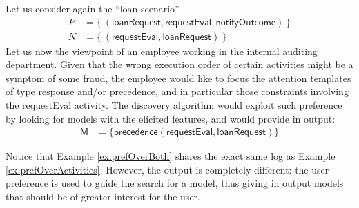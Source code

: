\begin{example}
\label{ex:prefOverBoth}
Let us consider again the ``loan scenario'' %
%
\begin{align*}
P & = \{\ (\mathsf{loanRequest}, \mathsf{requestEval}, \mathsf{notifyOutcome})\ \} \\
N & = \{\ (\mathsf{requestEval}, \mathsf{loanRequest})\ \}
\end{align*}
%
Let us  %
now the viewpoint of an employee working in the internal auditing department. Given that the wrong execution order of certain activities might be a symptom of some fraud, the employee would like to focus the attention  %
templates of type \textsf{response} and/or \textsf{precedence}, and in particular  %
those constraints involving the \textsf{requestEval} activity. The discovery algorithm would exploit such preference by looking for models with the elicited features, and would provide in output:
%
\begin{align*}
\mathsf{M} & = \{ \mathsf{precedence(requestEval,loanRequest)}\} \tag*{$\square$}
\end{align*}
\end{example}

Notice that Example \ref{ex:prefOverBoth} shares the exact same log as Example \ref{ex:prefOverActivities}. However, the output is completely different: the user preference is used to guide the search for a model, thus giving in output models that should be of greater interest for the user.
